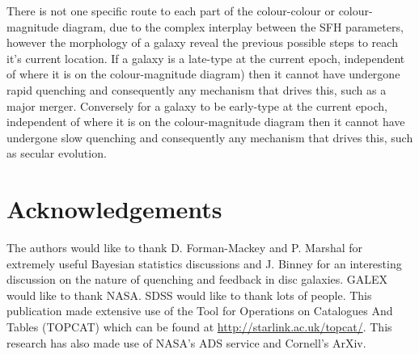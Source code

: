 \documentclass{mn2e}
\begin{document}
There is not one specific route to each part of the colour-colour or colour-magnitude diagram, due to the complex interplay between the SFH parameters, however the morphology of a galaxy reveal the previous possible steps to reach it's current location. If a galaxy is a late-type at the current epoch, independent of where it is on the colour-magnitude diagram) then it cannot have undergone rapid quenching and consequently any mechanism that drives this, such as a major merger. Conversely for a galaxy to be early-type at the current epoch, independent of where it is on the colour-magnitude diagram then it cannot have undergone slow quenching and consequently any mechanism that drives this, such as secular evolution. 

\section*{Acknowledgements}
The authors would like to thank D. Forman-Mackey and P. Marshal for extremely useful Bayesian statistics discussions and J. Binney for an interesting discussion on the nature of quenching and feedback in disc galaxies. GALEX would like to thank NASA. SDSS would like to thank lots of people. This publication made extensive use of the Tool for Operations on Catalogues And Tables (TOPCAT) which can be found at \url{http://starlink.ac.uk/topcat/}. This research has also made use of NASA's ADS service and Cornell's ArXiv. 
\end{document}
